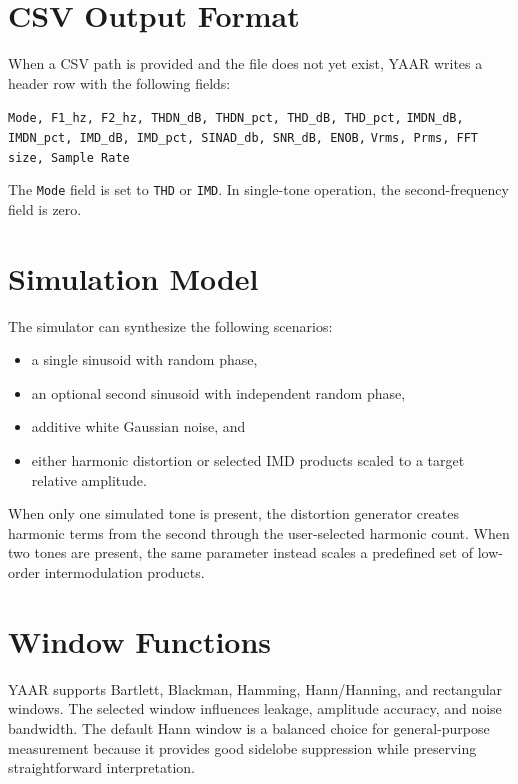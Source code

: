 \documentclass[conference]{IEEEtran}
\begin{document}
\section{CSV Output Format}
When a CSV path is provided and the file does not yet exist, YAAR writes a header row with the following fields:
\begin{center}
\footnotesize
\texttt{Mode, F1\_hz, F2\_hz, THDN\_dB, THDN\_pct, THD\_dB, THD\_pct,}\newline
\texttt{IMDN\_dB, IMDN\_pct, IMD\_dB, IMD\_pct, SINAD\_db, SNR\_dB, ENOB,}\newline
\texttt{Vrms, Prms, FFT size, Sample Rate}
\end{center}

The \texttt{Mode} field is set to \texttt{THD} or \texttt{IMD}. In single-tone operation, the second-frequency field is zero.

\section{Simulation Model}
The simulator can synthesize the following scenarios:
\begin{itemize}[leftmargin=*,nosep]
    \item a single sinusoid with random phase,
    \item an optional second sinusoid with independent random phase,
    \item additive white Gaussian noise, and
    \item either harmonic distortion or selected IMD products scaled to a target relative amplitude.
\end{itemize}

When only one simulated tone is present, the distortion generator creates harmonic terms from the second through the user-selected harmonic count. When two tones are present, the same parameter instead scales a predefined set of low-order intermodulation products.

\section{Window Functions}
YAAR supports Bartlett, Blackman, Hamming, Hann/Hanning, and rectangular windows. The selected window influences leakage, amplitude accuracy, and noise bandwidth. The default Hann window is a balanced choice for general-purpose measurement because it provides good sidelobe suppression while preserving straightforward interpretation.
\end{document}
